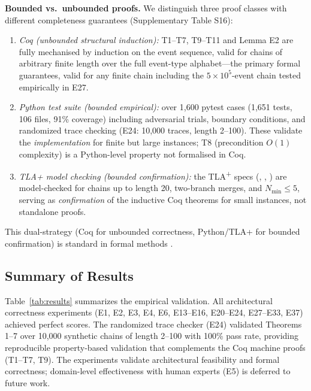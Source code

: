 \textbf{Bounded vs.~unbounded proofs.} We distinguish three proof classes with different completeness guarantees (Supplementary Table S16):
\begin{enumerate}[label=(\roman*)]
    \item \emph{Coq (unbounded structural induction):} T1--T7, T9--T11 and Lemma E2 are fully mechanised by induction on the event sequence, valid for chains of arbitrary finite length over the full event-type alphabet---the primary formal guarantees, valid for any finite chain including the $5\times10^5$-event chain tested empirically in E27.
    \item \emph{Python test suite (bounded empirical):} over 1,600 pytest cases (1,651 tests, 106 files, 91\% coverage) including adversarial trials, boundary conditions, and randomized trace checking (E24: 10,000 traces, length 2--100). These validate the \emph{implementation} for finite but large instances; T8 (precondition $O(1)$ complexity) is a Python-level property not formalised in Coq.
    \item \emph{TLA+ model checking (bounded confirmation):} the TLA\textsuperscript{+} specs (, , ) are model-checked for chains up to length 20, two-branch merges, and $N_{\min} \leq 5$, serving as \emph{confirmation} of the inductive Coq theorems for small instances, not standalone proofs.
\end{enumerate}
This dual-strategy (Coq for unbounded correctness, Python/TLA+ for bounded confirmation) is standard in formal methods \cite{lamport2002specifying,coq_reference}.

\subsection{Summary of Results}\label{subsec:results-summary}

Table~\ref{tab:results} summarizes the empirical validation. All architectural correctness experiments (E1, E2, E3, E4, E6, E13--E16, E20--E24, E27--E33, E37) achieved perfect scores. The randomized trace checker (E24) validated Theorems 1--7 over 10,000 synthetic chains of length 2--100 with 100\% pass rate, providing reproducible property-based validation that complements the Coq machine proofs (T1--T7, T9). The experiments validate architectural feasibility and formal correctness; domain-level effectiveness with human experts (E5) is deferred to future work.


